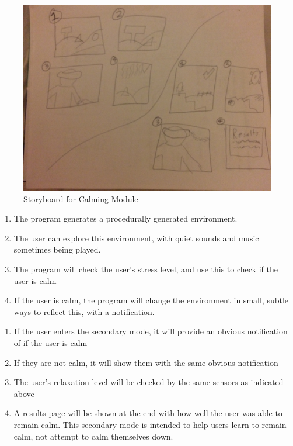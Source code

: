 \documentclass[a4paper,10pt]{article}
\begin{document}
\begin{figure}[H] %
	\centerline {\includegraphics[scale = 0.13, angle = 180]{sbCalm.jpg}}
	\caption{Storyboard for Calming Module}
	\label{fig:sbCalm}
\end{figure}
\begin{enumerate}
	\item The program generates a procedurally generated environment.
	\item The user can explore this environment, with quiet sounds and music sometimes being played.
	\item The program will check the user's stress level, and use this to check if the user is calm
	\item If the user is calm, the program will change the environment in small, subtle ways to reflect this, with a notification.
\end{enumerate}
\begin{enumerate}
	\item If the user enters the secondary mode, it will provide an obvious notification of if the user is calm
	\item If they are not calm, it will show them with the same obvious notification
	\item The user's relaxation level will be checked by the same sensors as indicated above
	\item A results page will be shown at the end with how well the user was able to remain calm.  This secondary mode is intended to help users learn to remain calm, not attempt to calm themselves down.
\end{enumerate}
\end{document}

